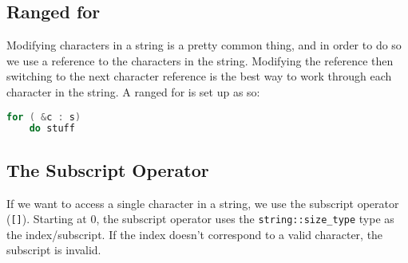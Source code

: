 \documentclass[12pt, a4paper]{report}
\begin{document}
\subsection{Ranged for}
Modifying characters in a string is a pretty common thing, and in order to do so we use a reference to the characters in the string.
Modifying the reference then switching to the next character reference is the best way to work through each character in the string.
A ranged for is set up as so:
\begin{lstlisting}[language=C++]
for ( &c : s)
	do stuff
\end{lstlisting}
\subsection{The Subscript Operator}
If we want to access a single character in a string, we use the subscript operator (\verb|[]|). Starting at 0, the subscript operator uses the
\verb|string::size_type| type as the index/subscript. If the index doesn't correspond to a valid character, the subscript is invalid.
\end{document}
